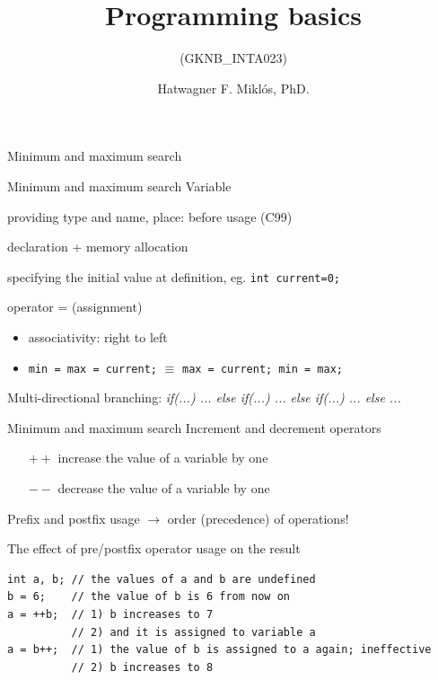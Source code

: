 \documentclass[usenames,dvipsnames,aspectratio=169]{beamer}
\title[Lecture 2.]{Programming basics}
\subtitle{(GKNB\_INTA023)}
\author{Hatwagner F. Miklós, PhD.}
\institute{Széchenyi István University, Győr, Hungary}
\newcommand{\kiemel}[1]{{\color{kiemelesszin}#1}}
\begin{document}
\begin{frame}[plain]
  \titlepage
\end{frame}

\begin{frame}{Minimum and maximum search}
    \begin{exampleblock}{}
    \tiny
    
  \end{exampleblock}
\end{frame}

\begin{frame}{Minimum and maximum search}
  Variable
  \begin{description}[initialization]
    \item[declaration] providing type and name, place: before usage (C99)
    \item[definition] declaration + memory allocation
    \item[initialization] specifying the initial value at definition, eg. \texttt{int current=0;}
  \end{description}
  \vfill
  operator = (assignment)
  \begin{itemize}
    \item associativity: right to left
    \item \texttt{min = max = current;} \kiemel{$\equiv$} \texttt{max = current; min = max;}
  \end{itemize}
  \vfill
  Multi-directional branching: \emph{if(...) ... else if(...) ... else if(...) ... else ...} \\
\end{frame}

\begin{frame}[fragile]{Minimum and maximum search}
  Increment and decrement operators
  \begin{itemize}
    \item[\texttt{$++$}] increase the value of a variable by one
    \item[\texttt{$--$}] decrease the value of a variable by one
  \end{itemize}
  Prefix and postfix usage $\to$ order (precedence) of operations!
  \vfill
  \begin{block}{The effect of pre/postfix operator usage on the result}
    \begin{verbatim}
int a, b; // the values of a and b are undefined
b = 6;    // the value of b is 6 from now on
a = ++b;  // 1) b increases to 7
          // 2) and it is assigned to variable a
a = b++;  // 1) the value of b is assigned to a again; ineffective
          // 2) b increases to 8
    \end{verbatim}
  \end{block}
\end{frame}
\end{document}
